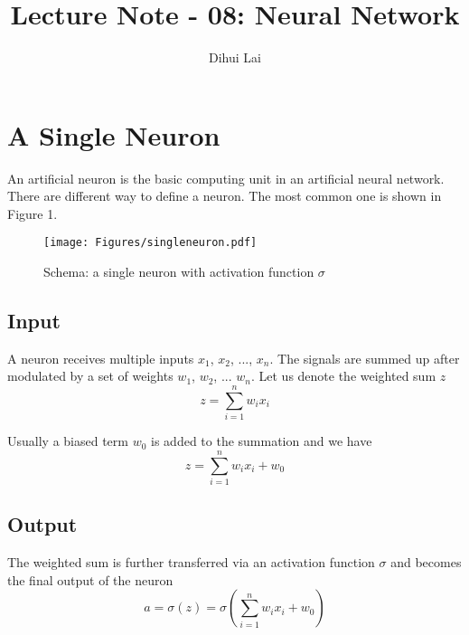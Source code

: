 \documentclass[12pt, oneside]{article}
\title{Lecture Note - 08: Neural Network}
\author{Dihui Lai}
\begin{document}
\maketitle
\tableofcontents

\vspace{.25in}

\section{A Single Neuron}

An artificial neuron is the basic computing unit in an artificial neural network. There are different way to define a neuron. The most common one is shown in Figure 1.
\begin{figure}
\center
\texttt{[image: Figures/singleneuron.pdf]}
\caption{Schema: a single neuron with activation function $\sigma$}
\end{figure}

\subsection{Input}
A neuron receives multiple inputs $x_1$, $x_2$, ..., $x_n$. The signals are summed up after modulated by a set of weights $w_1$, $w_2$, ... $w_n$. Let us denote the weighted sum $z$
\begin{equation}
z=\sum\limits_{i=1}^{n}w_i x_i
\end{equation}

Usually a biased term $w_0$ is added to the summation and we have 
\begin{equation}
z=\sum\limits_{i=1}^{n}w_i x_i+w_0
\end{equation}

\subsection{Output}
The weighted sum is further transferred via an activation function $\sigma$ and becomes the final output of the neuron
\begin{equation}
a=\sigma(z)=\sigma(\sum\limits_{i=1}^{n}w_i x_i+w_0)
\end{equation}
\end{document}
